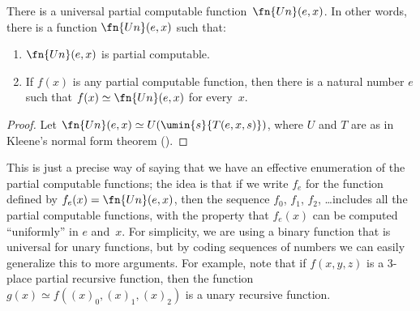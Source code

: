 \documentclass[../../../include/open-logic-section]{subfiles}
\begin{document}

\begin{thm}
There is a universal partial computable function~$\fn{Un}(e,x)$. In other
words, there is a function $\fn{Un}(e,x)$ such that:
\begin{enumerate}
\item $\fn{Un}(e,x)$ is partial computable.
\item If $f(x)$ is any partial computable function, then there is a
natural number $e$ such that $f(x) \simeq \fn{Un}(e,x)$ for every~$x$.
\end{enumerate}
\end{thm}

\begin{proof}
Let $\fn{Un}(e,x) \simeq U(\umin{s}{T(e,x,s)})$, where $U$ and $T$ are
as in Kleene's normal form theorem ().
\end{proof}

\begin{explain}
This is just a precise way of saying that we have an effective
enumeration of the partial computable functions; the idea is that if
we write $f_e$ for the function defined by $f_e(x) = \fn{Un}(e,x)$,
then the sequence $f_0$, $f_1$, $f_2$, \dots includes all the partial
computable functions, with the property that $f_e(x)$ can be computed
``uniformly'' in $e$ and~$x$. For simplicity, we are using a binary
function that is universal for unary functions, but by coding
sequences of numbers we can easily generalize this to more arguments.
For example, note that if $f(x,y,z)$ is a $3$-place partial recursive
function, then the function $g(x) \simeq f((x)_0, (x)_1, (x)_2)$ is a
unary recursive function.
\end{explain}
\end{document}
